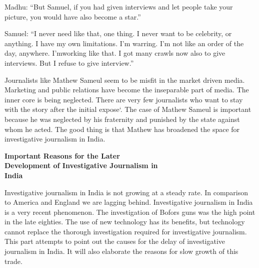 \begin{multicols}{2}

\noi
Madhu: “But Samuel, if you had given interviews and let people take your picture, you would
have also become a star.”


\noi
Samuel: “I never need like that, one thing. I never want to be celebrity, or anything. I have my
own limitations. I’m warring. I’m not like an order of the day, anywhere. I’mworking like that.
I got many crawls now also to give interviews. But I refuse to give interview.”


\noi
Journalists like Mathew Sameul seem to be misfit in the market driven media. Marketing and
public relations have become the inseparable part of media. The inner core is being neglected.
There are very few journalists who want to stay with the story after the initial expose`. The
case of Mathew Sameul is important because he was neglected by his fraternity and punished
by the state against whom he acted. The good thing is that Mathew has broadened the space for
investigative journalism in India.


\noi
{\large \bfseries  Important Reasons for the Later\\ Development of Investigative Journalism in\\ India}


\noi
Investigative journalism in India is not growing at a steady rate. In comparison to America and
England we are lagging behind. Investigative journalism in India is a very recent phenomenon.
The investigation of Bofors guns was the high point in the late eighties. The use of new
technology has its benefits, but technology cannot replace the thorough investigation required
for investigative journalism. This part attempts to point out the causes for the delay of
investigative journalism in India. It will also elaborate the reasons for slow growth of this trade.




\end{multicols}
